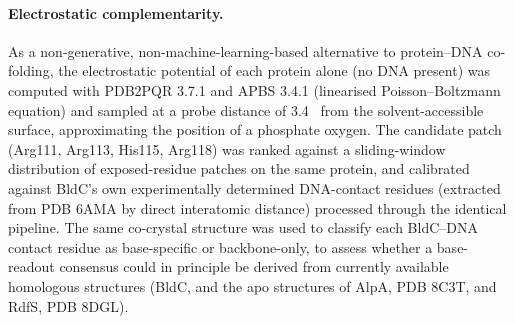 \documentclass[11pt,a4paper]{article}
\newcommand{\ang}{\text{\AA}}
\begin{document}
\paragraph{Electrostatic complementarity.} As a non-generative, non-machine-learning-based
alternative to protein--DNA co-folding, the electrostatic potential of each protein alone (no DNA
present) was computed with PDB2PQR 3.7.1 and APBS 3.4.1 (linearised Poisson--Boltzmann equation)
\citep{jurrus2018apbs} and sampled at a probe distance of 3.4~\ang{} from the solvent-accessible
surface, approximating the position of a phosphate oxygen. The candidate patch (Arg111, Arg113,
His115, Arg118) was ranked against a sliding-window distribution of exposed-residue patches on the
same protein, and calibrated against BldC's own experimentally determined DNA-contact residues
(extracted from PDB 6AMA by direct interatomic distance) processed through the identical pipeline.
The same co-crystal structure was used to classify each BldC--DNA contact residue as base-specific
or backbone-only, to assess whether a base-readout consensus could in principle be derived from
currently available homologous structures (BldC, and the apo structures of AlpA, PDB 8C3T, and RdfS,
PDB 8DGL).
\end{document}
